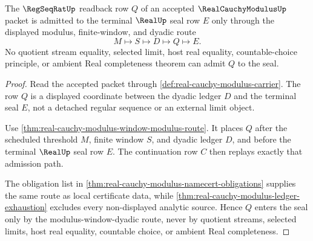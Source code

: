 \begin{theorem}
\label{thm:real-cauchy-modulus-regseqrat-seal-admission}
The $\RegSeqRatUp$ readback row $Q$ of an accepted $\RealCauchyModulusUp$ packet is admitted to the terminal $\RealUp$ seal row $E$ only through the displayed modulus, finite-window, and dyadic route
$$
M\longmapsto S\longmapsto D\longmapsto Q\longmapsto E.
$$
No quotient stream equality, selected limit, host real equality, countable-choice principle, or ambient Real completeness theorem can admit $Q$ to the seal.
\end{theorem}
\begin{proof}
Read the accepted packet through \autoref{def:real-cauchy-modulus-carrier}. The row $Q$ is a displayed coordinate between the dyadic ledger $D$ and the terminal seal $E$, not a detached regular sequence or an external limit object.

Use \autoref{thm:real-cauchy-modulus-window-modulus-route}. It places $Q$ after the scheduled threshold $M$, finite window $S$, and dyadic ledger $D$, and before the terminal $\RealUp$ seal row $E$. The continuation row $C$ then replays exactly that admission path.

The obligation list in \autoref{thm:real-cauchy-modulus-namecert-obligations} supplies the same route as local certificate data, while \autoref{thm:real-cauchy-modulus-ledger-exhaustion} excludes every non-displayed analytic source. Hence $Q$ enters the seal only by the modulus-window-dyadic route, never by quotient streams, selected limits, host real equality, countable choice, or ambient Real completeness.
\end{proof}

